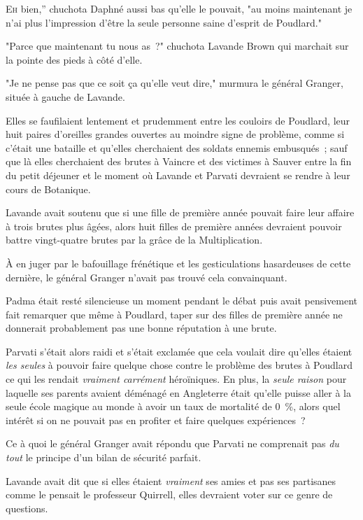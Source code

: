 
\lettrine[ante=<<~]{E}{h} bien,” chuchota Daphné aussi bas qu'elle le pouvait, "au moins maintenant je n'ai plus l'impression d'être la seule personne saine d'esprit de Poudlard."

"Parce que maintenant tu nous as~?" chuchota Lavande Brown qui marchait sur la pointe des pieds à côté d'elle.

"Je ne pense pas que ce soit ça qu'elle veut dire," murmura le général Granger, située à gauche de Lavande.

Elles se faufilaient lentement et prudemment entre les couloirs de Poudlard, leur huit paires d'oreilles grandes ouvertes au moindre signe de problème, comme si c'était une bataille et qu'elles cherchaient des soldats ennemis embusqués~; sauf que là elles cherchaient des brutes à Vaincre et des victimes à Sauver entre la fin du petit déjeuner et le moment où Lavande et Parvati devraient se rendre à leur cours de Botanique.

Lavande avait soutenu que si une fille de première année pouvait faire leur affaire à trois brutes plus âgées, alors huit filles de première années devraient pouvoir battre vingt-quatre brutes par la grâce de la Multiplication.

À en juger par le bafouillage frénétique et les gesticulations hasardeuses de cette dernière, le général Granger n'avait pas trouvé cela convainquant.

Padma était resté silencieuse un moment pendant le débat puis avait pensivement fait remarquer que même à Poudlard, taper sur des filles de première année ne donnerait probablement pas une bonne réputation à une brute.

Parvati s'était alors raidi et s'était exclamée que cela voulait dire qu'elles étaient \emph{les seules} à pouvoir faire quelque chose contre le problème des brutes à Poudlard ce qui les rendait \emph{vraiment carrément} héroïniques. En plus, la \emph{seule raison} pour laquelle ses parents avaient déménagé en Angleterre était qu'elle puisse aller à la seule école magique au monde à avoir un taux de mortalité de 0~\%, alors quel intérêt si on ne pouvait pas en profiter et faire quelques expériences~?

Ce à quoi le général Granger avait répondu que Parvati ne comprenait pas \emph{du tout} le principe d'un bilan de sécurité parfait.

Lavande avait dit que si elles étaient \emph{vraiment} ses amies et pas ses partisanes comme le pensait le professeur Quirrell, elles devraient voter sur ce genre de questions.

